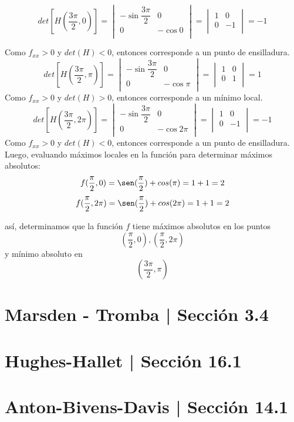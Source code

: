 \documentclass[a4paper,12pt]{article}
\begin{document}
		$$det[H(\frac{3\pi}{2}, 0)] =
			\begin{vmatrix}
				-\sin \dfrac{3\pi}{2} & 0 \\
				0  & - \cos 0 \\
			\end{vmatrix} =
			\begin{vmatrix}
				1 & 0 \\
				 0 & -1 \\
			\end{vmatrix} = -1$$

		Como $f_{xx} > 0$ y $det(H) < 0$, entonces corresponde a un punto de ensilladura.\\
		$$det[H(\frac{3\pi}{2}, \pi)] =
			\begin{vmatrix}
				-\sin \dfrac{3\pi}{2} & 0 \\
				0  & - \cos \pi \\
			\end{vmatrix} =
			\begin{vmatrix}
				1 & 0 \\
				 0 & 1 \\
			\end{vmatrix} = 1$$
		Como $f_{xx} > 0$ y $det(H) > 0$, entonces corresponde a un mínimo local.\\
		$$det[H(\frac{3\pi}{2}, 2\pi)] =
			\begin{vmatrix}
				-\sin \dfrac{3\pi}{2} & 0 \\
				0  & - \cos 2\pi \\
			\end{vmatrix} =
			\begin{vmatrix}
				1 & 0 \\
				 0 & -1 \\
			\end{vmatrix} = -1$$
		Como $f_{xx} > 0$ y $det(H) < 0$, entonces corresponde a un punto de ensilladura.\\


		Luego, evaluando máximos locales en la función para determinar
		máximos absolutos:
			$$ f(\frac{\pi}{2}, 0) = \sen(\frac{\pi}{2}) + cos(\pi) = 1 + 1 = 2 $$
			$$ f(\frac{\pi}{2}, 2\pi) = \sen(\frac{\pi}{2}) + cos(2\pi) = 1 + 1 = 2$$

		así, determinamos que la función $f$ tiene máximos absolutos en los puntos
			$$(\frac{\pi}{2}, 0), (\frac{\pi}{2}, 2\pi)$$
		y mínimo absoluto en
			$$(\frac{3\pi}{2}, \pi)$$

	\section{Marsden - Tromba | Sección 3.4}
	\section{Hughes-Hallet | Sección 16.1}
	\section{Anton-Bivens-Davis | Sección 14.1}
\end{document}
